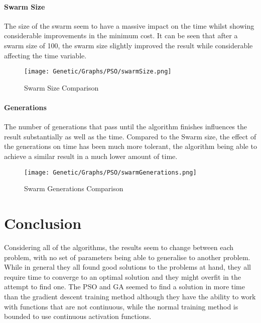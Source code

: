 \documentclass{report}
\begin{document}
\subsubsection{Swarm Size}
The size of the swarm seem to have a massive impact on the time whilst showing considerable improvements in the minimum cost. It can be seen that after a swarm size of 100, the swarm size slightly improved the result while considerable affecting the time variable.
\begin{figure}[htp]
\centering
\texttt{[image: Genetic/Graphs/PSO/swarmSize.png]}
\caption{Swarm Size Comparison}
\label{sizeSwarm}
\end{figure}

\newpage
\subsubsection{Generations}
The number of generations that pass until the algorithm finishes influences the result substantially as well as the time. Compared to the Swarm size, the effect of the generations on time has been much more tolerant, the algorithm being able to achieve a similar result in a much lower amount of time.
\begin{figure}[htp]
\centering
\texttt{[image: Genetic/Graphs/PSO/swarmGenerations.png]}
\caption{Swarm Generations Comparison}
\label{generationsSwarm}
\end{figure}


\chapter{Conclusion}

Considering all of the algorithms, the results seem to change between each problem, with no set of parameters being able to generalise to another problem. While in general they all found good solutions to the problems at hand, they all require time to converge to an optimal solution and they might overfit in the attempt to find one. The PSO and GA seemed to find a solution in more time than the gradient descent training method although they have the ability to work with functions that are not continuous, while the normal training method is bounded to use continuous activation functions.


%
%

\end{document}
